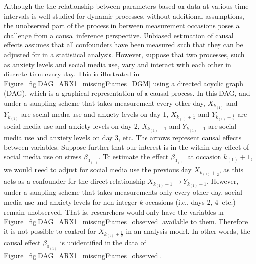 \documentclass[man]{apa7} %
\begin{document}
Although the the relationship between parameters based on data at various time intervals is well-studied for dynamic processes, without additional assumptions, the unobserved part of the process in between measurement occasions poses a challenge from a causal inference perspective. Unbiased estimation of causal effects assumes that all confounders have been measured such that they can be adjusted for in a statistical analysis. However, suppose that two processes, such as anxiety levels and social media use, vary and interact with each other in discrete-time every day. This is illustrated in Figure~\ref{fig:DAG_ARX1_missingFrames_DGM} using a directed acyclic graph (DAG), which is a graphical representation of a causal process. In this DAG, and under a sampling scheme that takes measurement every other day, $X_{k_{(1)}}$ and $Y_{k_{(1)}}$ are social media use and anxiety levels on day 1, $X_{k_{(1)} + \frac{1}{2}}$ and $Y_{k_{(1)} + \frac{1}{2}}$ are social media use and anxiety levels on day 2, $X_{k_{(1)} + 1}$ and $Y_{k_{(1)} + 1}$ are social media use and anxiety levels on day 3, etc. The arrows represent causal effects between variables. Suppose further that our interest is in the within-day effect of social media use on stress $\beta_{0_{(1)}}$. To estimate the effect $\beta_{0_{(1)}}$ at occasion $k_{(1)} + 1$, we would need to adjust for social media use the previous day $X_{k_{(1)} + \frac{1}{2}}$, as this acts as a confounder for the direct relationship $X_{k_{(1)} + 1} \rightarrow Y_{k_{(1)} + 1}$. However, under a sampling scheme that takes measurements only every other day, social media use and anxiety levels for non-integer $k$-occasions (i.e., days 2, 4, etc.) remain unobserved. That is, researchers would only have the variables in Figure~\ref{fig:DAG_ARX1_missingFrames_observed} available to them. Therefore it is not possible to control for $X_{k_{(1)} + \frac{1}{2}}$ in an analysis model. In other words, the causal effect $\beta_{0_{(1)}}$ is unidentified in the data of Figure~\ref{fig:DAG_ARX1_missingFrames_observed}. 
\end{document}
